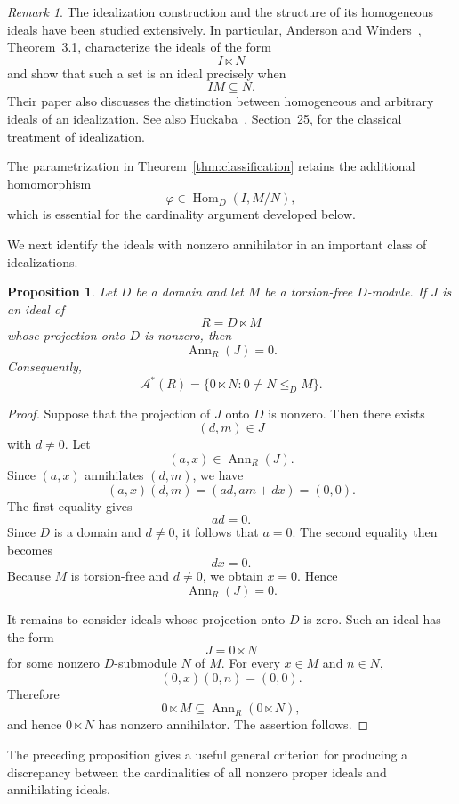 \documentclass[11pt]{article}
\newtheorem{proposition}[theorem]{Proposition}
\theoremstyle{definition}
\theoremstyle{remark}
\newtheorem{remark}[theorem]{Remark}
\newcommand{\Ann}{\operatorname{Ann}}
\newcommand{\Hom}{\operatorname{Hom}}
\begin{document}
	
	\begin{remark}
		\label{rem:literature}
		The idealization construction and the structure of its homogeneous
		ideals have been studied extensively. In particular, Anderson and
		Winders~\cite{AndersonWinders}, Theorem~3.1, characterize the ideals
		of the form
		\[
		I\ltimes N
		\]
		and show that such a set is an ideal precisely when
		\[
		IM\subseteq N.
		\]
		Their paper also discusses the distinction between homogeneous and
		arbitrary ideals of an idealization. See also Huckaba~\cite{Huckaba},
		Section~25, for the classical treatment of idealization.
		
		The parametrization in Theorem~\ref{thm:classification} retains the
		additional homomorphism
		\[
		\varphi\in\Hom_D(I,M/N),
		\]
		which is essential for the cardinality argument developed below.
	\end{remark}
	
	
	We next identify the ideals with nonzero annihilator in an important
	class of idealizations.
	
	\begin{proposition}
		\label{prop:ann}
		Let $D$ be a domain and let $M$ be a torsion-free $D$-module. If $J$
		is an ideal of
		\[
		R=D\ltimes M
		\]
		whose projection onto $D$ is nonzero, then
		\[
		\Ann_R(J)=0.
		\]
		Consequently,
		\[
		\mathcal A^*(R)
		=
		\{0\ltimes N:0\neq N\leq_D M\}.
		\]
	\end{proposition}
	
	\begin{proof}
		Suppose that the projection of $J$ onto $D$ is nonzero. Then there
		exists
		\[
		(d,m)\in J
		\]
		with $d\neq0$. Let
		\[
		(a,x)\in\Ann_R(J).
		\]
		Since $(a,x)$ annihilates $(d,m)$, we have
		\[
		(a,x)(d,m)=(ad,am+dx)=(0,0).
		\]
		The first equality gives
		\[
		ad=0.
		\]
		Since $D$ is a domain and $d\neq0$, it follows that $a=0$. The second
		equality then becomes
		\[
		dx=0.
		\]
		Because $M$ is torsion-free and $d\neq0$, we obtain $x=0$. Hence
		\[
		\Ann_R(J)=0.
		\]
		
		It remains to consider ideals whose projection onto $D$ is zero. Such
		an ideal has the form
		\[
		J=0\ltimes N
		\]
		for some nonzero $D$-submodule $N$ of $M$. For every $x\in M$ and
		$n\in N$,
		\[
		(0,x)(0,n)=(0,0).
		\]
		Therefore
		\[
		0\ltimes M\subseteq\Ann_R(0\ltimes N),
		\]
		and hence $0\ltimes N$ has nonzero annihilator. The assertion follows.
	\end{proof}
	
	
	The preceding proposition gives a useful general criterion for
	producing a discrepancy between the cardinalities of all nonzero
	proper ideals and annihilating ideals.
	
\end{document}

